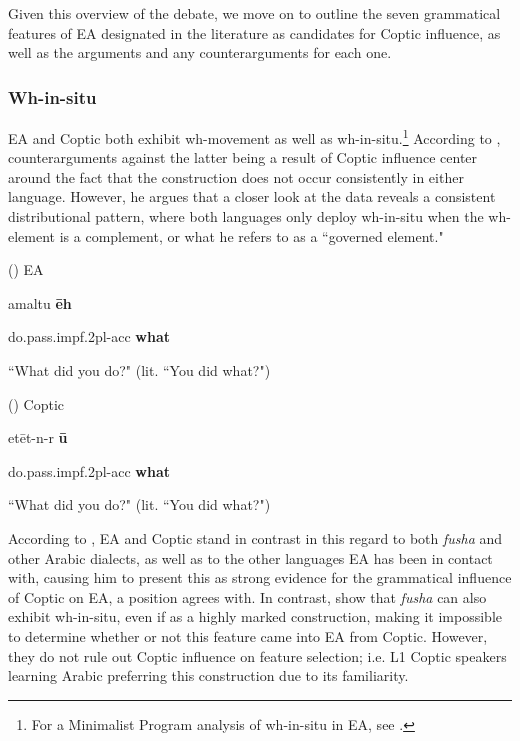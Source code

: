 \documentclass[12pt,a4paper]{article}
\newcounter{example}
\begin{document}
Given this overview of the debate, we move on to outline the seven grammatical features of EA designated in the literature as candidates for Coptic influence, as well as the arguments and any counterarguments for each one.

\subsubsection{Wh-in-situ}
\label{subsubsec:wh-in-situ}

EA and Coptic both exhibit wh-movement as well as wh-in-situ.\footnote{For a Minimalist Program analysis of wh-in-situ in EA, see \textcite{gad_syntactic_2011}.} According to \textcite{bishai_coptic_1962}, counterarguments against the latter being a result of Coptic influence center around the fact that the construction does not occur consistently in either language. However, he argues that a closer look at the data reveals a consistent distributional pattern, where both languages only deploy wh-in-situ when the wh-element is a complement, or what he refers to as a ``governed element."

\vspace{3mm}
(\theexample) EA

\textrevglotstop amaltu \textbf{ēh}

do.pass.impf.2pl-acc \textbf{what}

``What did you do?" (lit. ``You did what?")

\vspace{3mm}
(\theexample) Coptic

etēt-n-r \textbf{ū}

do.pass.impf.2pl-acc \textbf{what}

``What did you do?" (lit. ``You did what?")
\begin{flushright}
\parencite[286]{bishai_coptic_1962}
\end{flushright}

According to \textcite{bishai_coptic_1962}, EA and Coptic stand in contrast in this regard to both \textit{fusha} and other Arabic dialects, as well as to the other languages EA has been in contact with, causing him to present this as strong evidence for the grammatical influence of Coptic on EA, a position \textcite{nishio_word_1995} agrees with. In contrast, \textcite{versteegh_whats_2004, al-sharkawi_arabicization_2005} show that \textit{fusha} can also exhibit wh-in-situ, even if as a highly marked construction, making it impossible to determine whether or not this feature came into EA from Coptic. However, they do not rule out Coptic influence on feature selection; i.e. L1 Coptic speakers learning Arabic preferring this construction due to its familiarity.
\end{document}
